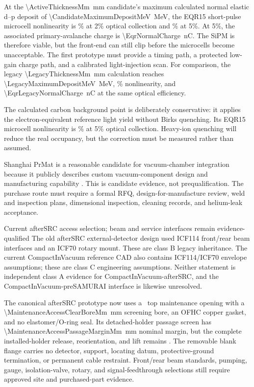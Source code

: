 \documentclass[10pt,letterpaper]{article}
\begin{document}
At the \SI{\ActiveThicknessMm}{\milli\meter} candidate's maximum calculated normal elastic
d--p deposit of \SI{\CandidateMaximumDepositMeV}{\mega\electronvolt}, the EQR15 short-pulse microcell
nonlinearity is \EqrNormalNonlinearityTwo\% at 2\% optical collection and
\EqrNormalNonlinearityFive\% at 5\%. At 5\%, the associated primary-avalanche charge is
\SI{\EqrNormalCharge}{\nano\coulomb}. The SiPM is therefore viable, but the front-end can
still clip before the microcells become unacceptable. The first prototype must provide a
timing path, a protected low-gain charge path, and a calibrated light-injection scan.
For comparison, the legacy \SI{\LegacyThicknessMm}{\milli\meter} calculation reaches
\SI{\LegacyMaximumDepositMeV}{\mega\electronvolt}, \EqrLegacyNormalNonlinearityFive\%
nonlinearity, and \SI{\EqrLegacyNormalCharge}{\nano\coulomb} at the same optical efficiency.

The calculated carbon background point is deliberately conservative: it applies the
electron-equivalent reference light yield without Birks quenching. Its EQR15 microcell
nonlinearity is \EqrCarbonNonlinearity\% at 5\% optical collection. Heavy-ion quenching
will reduce the real occupancy, but the correction must be measured rather than assumed.

Shanghai PrMat is a reasonable candidate for vacuum-chamber integration because it publicly
describes custom vacuum-component design and manufacturing capability
\cite{prmat_about,prmat_kcell}. This is candidate evidence, not prequalification. The
purchase route must require a formal RFQ, design-for-manufacture review, weld and inspection
plans, dimensional inspection, cleaning records, and helium-leak acceptance.

\begin{warningbox}{Current afterSRC access selection; beam and service interfaces remain evidence-qualified}
  The old afterSRC external-detector design used ICF114 front/rear beam interfaces and an
  ICF70 rotary mount. These are class B legacy inheritance. The current CompactInVacuum
  reference CAD also contains ICF114/ICF70 envelope assumptions; these are class C engineering
  assumptions. Neither statement is independent class A evidence for CompactInVacuum-afterSRC,
  and the CompactInVacuum-preSAMURAI interface is likewise unresolved.

  The canonical afterSRC prototype now uses a \MaintenanceAccessStandard\ top maintenance
  opening with a \SI{\MaintenanceAccessClearBoreMm}{\milli\meter} screening bore, an OFHC
  copper gasket, and no elastomer/O-ring seal. Its detached-holder passage screen has
  \SI{\MaintenanceAccessPassageMarginMm}{\milli\meter} nominal margin, but the complete
  installed-holder release, reorientation, and lift remains \MaintenanceExtractionStatus.
  The removable blank flange carries no detector, support, locating datum, protective-ground
  termination, or permanent cable restraint. Front/rear beam standards, pumping, gauge,
  isolation-valve, rotary, and signal-feedthrough selections still require approved site and
  purchased-part evidence.
\end{warningbox}
\end{document}
